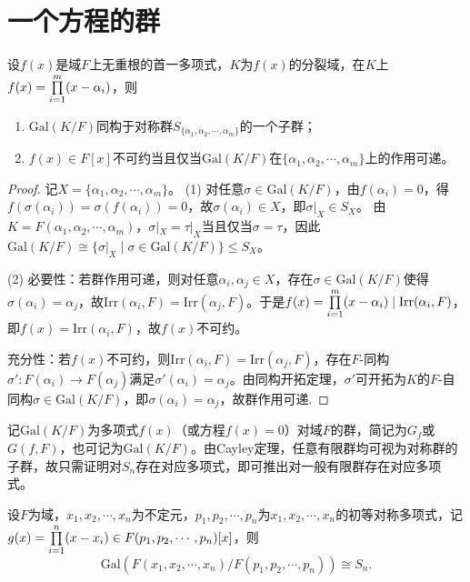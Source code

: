 \documentclass[../../main.tex]{subfiles}%
\begin{document}
\section{一个方程的群}

\begin{theorem}
设$f(x)$是域$F$上无重根的首一多项式，$K$为$f(x)$的分裂域，在$K$上$f(x)=\prod\limits_{i=1}^m\limits (x-\alpha_i)$，则
\begin{enumerate}[(1)]
\item $\mathrm{Gal}(K/F)$同构于对称群$S_{\{\alpha_1,\alpha_2,\cdots,\alpha_m\}}$的一个子群；
\item $f(x)\in F[x]$不可约当且仅当$\mathrm{Gal}(K/F)$在$\{\alpha_1,\alpha_2,\cdots,\alpha_m\}$上的作用可递。
\end{enumerate}
\end{theorem}

\begin{proof}
记$X=\{\alpha_1,\alpha_2,\cdots,\alpha_m\}$。
(1) 对任意$\sigma\in\mathrm{Gal}(K/F)$，由$f(\alpha_i)=0$，得$f(\sigma(\alpha_i))=\sigma(f(\alpha_i))=0$，故$\sigma(\alpha_i)\in X$，即$\sigma|_X\in S_X$。
由$K=F(\alpha_1,\alpha_2,\cdots,\alpha_m)$，$\sigma|_X=\tau|_X$当且仅当$\sigma=\tau$，因此$\mathrm{Gal}(K/F)\cong\{\sigma|_X\mid \sigma\in\mathrm{Gal}(K/F)\}\leqslant S_X$。

(2) 必要性：若群作用可递，则对任意$\alpha_i,\alpha_j\in X$，存在$\sigma\in\mathrm{Gal}(K/F)$使得$\sigma(\alpha_i)=\alpha_j$，故$\mathrm{Irr}(\alpha_i,F)=\mathrm{Irr}(\alpha_j,F)$。于是$f(x)=\prod\limits_{i=1}^m\limits (x-\alpha_i)\mid \mathrm{Irr}(\alpha_i,F)$，即$f(x)=\mathrm{Irr}(\alpha_i,F)$，故$f(x)$不可约。

充分性：若$f(x)$不可约，则$\mathrm{Irr}(\alpha_i,F)=\mathrm{Irr}(\alpha_j,F)$，存在$F$-同构$\sigma'\colon F(\alpha_i)\to F(\alpha_j)$满足$\sigma'(\alpha_i)=\alpha_j$。由同构开拓定理，$\sigma'$可开拓为$K$的$F$-自同构$\sigma\in\mathrm{Gal}(K/F)$，即$\sigma(\alpha_i)=\alpha_j$，故群作用可递.
\end{proof}

\begin{remark}
记$\mathrm{Gal}(K/F)$为多项式$f(x)$（或方程$f(x)=0$）对域$F$的群，简记为$G_f$或$G(f,F)$，也可记为$\mathrm{Gal}(K/F)$。由Cayley定理，任意有限群均可视为对称群的子群，故只需证明对$S_n$存在对应多项式，即可推出对一般有限群存在对应多项式。
\end{remark}

\begin{theorem}
设$F$为域，$x_1,x_2,\cdots,x_n$为不定元，$p_1,p_2,\cdots,p_n$为$x_1,x_2,\cdots,x_n$的初等对称多项式，记$g(x)=\prod\limits_{i=1}^n\limits (x-x_i)\in F(p_1,p_2,\cdots,p_n)[x]$，则
$$\mathrm{Gal}(F(x_1,x_2,\cdots,x_n)/F(p_1,p_2,\cdots,p_n))\cong S_n.$$
\end{theorem}
\end{document}
